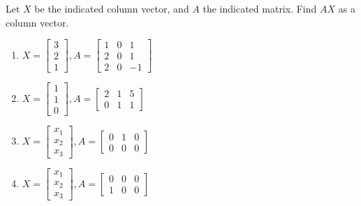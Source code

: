 \begin{exercise}
    Let $X$ be the indicated column vector, and $A$ the indicated matrix. Find $AX$ as a column vector.
    \begin{enumerate}[label={(\alph*)}]
        \item $X = \begin{bmatrix}3 \\ 2 \\ 1\end{bmatrix}, A = \begin{bmatrix}1 & 0 & 1 \\ 2 & 0 & 1 \\ 2 & 0 & -1\end{bmatrix}$
        \item $X = \begin{bmatrix}1 \\ 1 \\ 0\end{bmatrix}, A = \begin{bmatrix}2 & 1 & 5 \\ 0 & 1 & 1\end{bmatrix}$
        \item $X = \begin{bmatrix}x_{1} \\ x_{2} \\ x_{3}\end{bmatrix}, A = \begin{bmatrix}0 & 1 & 0 \\ 0 & 0 & 0\end{bmatrix}$
        \item $X = \begin{bmatrix}x_{1} \\ x_{2} \\ x_{3}\end{bmatrix}, A = \begin{bmatrix}0 & 0 & 0 \\ 1 & 0 & 0\end{bmatrix}$
    \end{enumerate}
\end{exercise}

